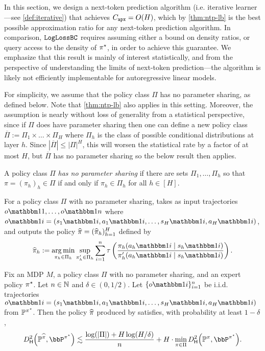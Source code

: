 In this section, we design a next-token prediction algorithm (i.e. iterative learner---see \cref{def:iterative}) that achieves $C_{\texttt{apx}} = O(H)$, which by \cref{thm:ntp-lb} is the best possible approximation ratio for any next-token prediction algorithm. In comparison, $\texttt{LogLossBC}$ requires assuming either a bound on density ratios, or query access to the density of $\pi^{\star}$, in order to achieve this guarantee. We emphasize that this result is mainly of interest statistically, and from the perspective of understanding the limits of next-token prediction---the algorithm is likely not efficiently implementable for autoregressive linear models.

For simplicity, we assume that the policy class $\Pi$ has no parameter sharing, as defined below. Note that \cref{thm:ntp-lb} also applies in this setting. Moreover, the assumption is nearly without loss of generality from a statistical perspective, since if $\Pi$ does have parameter sharing then one can define a new policy class $\overline{\Pi} := \Pi_1 \times \dots \times \Pi_H$ where $\Pi_h$ is the class of possible conditional distributions at layer $h$. Since $|\overline{\Pi}| \leq |\Pi|^H$, this will worsen the statistical rate by a factor of at most $H$, but $\overline{\Pi}$ has no parameter sharing so the below result then applies.

\begin{definition}
A policy class $\Pi$ \emph{has no parameter sharing} if there are sets $\Pi_1,\dots,\Pi_h$ so that $\pi = (\pi_h)_h \in \Pi$ if and only if $\pi_h \in \Pi_h$ for all $h \in [H]$.
\end{definition}

For a policy class $\Pi$ with no parameter sharing, \layerrhobc takes as input trajectories $o\ind{1},\dots,o\ind{n}$ where $o\ind{i} = (s_1\ind{i},a_1\ind{i},\dots,s_H\ind{i},a_H\ind{i})$, and outputs the policy $\widehat{\pi} = (\widehat{\pi}_h)_{h=1}^H$ defined by
\[\pihat_h := \argmin_{\pi_h \in \Pi_h} \sup_{\pi'_h \in \Pi_h} \sum_{i=1}^n\tau\left( \frac{\pihi}{\piphi}\right).\]


\begin{proposition}\label{prop:layerwise-rho}
Fix an MDP $M$, a policy class $\Pi$ with no parameter sharing, and an expert policy $\pi^{\star}$. Let $n \in \mathbb{N}$ and $\delta \in (0,1/2)$. Let $\{o\ind{i}\}_{i=1}^n$ be i.i.d. trajectories $o\ind{i} = (s_1\ind{i},a_1\ind{i},\dots,s_H\ind{i},a_H\ind{i})$ from $\mathbb{P}^{\pi^{\star}}$. Then the policy $\widehat{\pi}$ produced by \layerrhobc satisfies, with probability at least $1-\delta$,
\begin{equation} \Dhels{\BP^{\pihat}}{\bbP^{\pistar}} \lesssim \frac{\log(|\Pi|) + H\log(H/\delta)}{n} + H \cdot \min_{\pi \in \Pi} \Dhels{\BP^\pi}{\bbP^{\pistar}}.
\end{equation}
\end{proposition}

